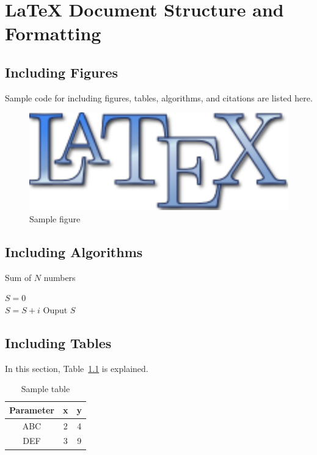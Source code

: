 \chapter{LaTeX Document Structure and Formatting}\label{ch:latex_format}
\graphicspath{{figures/chapter_2/}} %

\section{Including Figures}\label{sec:figures}
Sample code for including figures, tables, algorithms, and citations
are listed here.
\begin{figure}[h]
	\centering
	\includegraphics[scale=0.15]{latexlogo.pdf}
	\caption{Sample figure}
	\label{fig:latexlogo}
\end{figure}


\section{Including Algorithms}\label{sec:algorithms}
\begin{algorithm}[h]
	\caption{Sum of $N$ numbers}
	$S = 0$\\
	{
		$S = S + i$
	}
	Ouput $S$
\end{algorithm}


\section{Including Tables}\label{sec:tables}
In this section, Table~\ref{tab:sample1} is explained.
\begin{table}[h]
	\centering
	\caption{Sample table}
	\begin{tabular}{| c | c | c |}\hline
	\textbf{Parameter} & \textbf{x} & \textbf{y} \\\hline\hline
	ABC & 2 & 4 \\\hline
	DEF & 3 & 9 \\\hline	
	\end{tabular}
	\label{tab:sample1}
\end{table}

